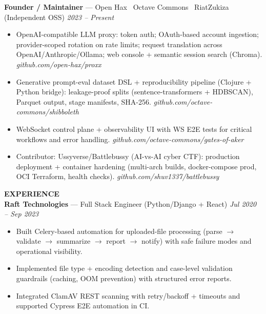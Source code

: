 \documentclass[10pt]{article}
\begin{document}
\textbf{Founder / Maintainer} --- Open Hax \textbullet\ Octave Commons \textbullet\ RiatZukiza (Independent OSS) \hfill \textit{2023 -- Present}\\
\vspace{-6pt}
\begin{itemize}
  \setlength\itemsep{-2pt}
  \setlength\parskip{0pt}
  \setlength\parsep{0pt}
  \item OpenAI-compatible LLM proxy: token auth; OAuth-based account ingestion; provider-scoped rotation on rate limits; request translation across OpenAI/Anthropic/Ollama; web console + semantic session search (Chroma). \textit{github.com/open-hax/proxx}
  \item Generative prompt-eval dataset DSL + reproducibility pipeline (Clojure + Python bridge): leakage-proof splits (sentence-transformers + HDBSCAN), Parquet output, stage manifests, SHA-256. \textit{github.com/octave-commons/shibboleth}
  \item WebSocket control plane + observability UI with WS E2E tests for critical workflows and error handling. \textit{github.com/octave-commons/gates-of-aker}
  \item Contributor: Ussyverse/Battlebussy (AI-vs-AI cyber CTF): production deployment + container hardening (multi-arch builds, docker-compose prod, OCI Terraform, health checks). \textit{github.com/shuv1337/battlebussy}
\end{itemize}

\vspace{6pt}
\textbf{EXPERIENCE}\\

\textbf{Raft Technologies} --- Full Stack Engineer (Python/Django + React) \hfill \textit{Jul 2020 -- Sep 2023}\\
\vspace{-6pt}
\begin{itemize}
  \setlength\itemsep{-2pt}
  \setlength\parskip{0pt}
  \setlength\parsep{0pt}
  \item Built Celery-based automation for uploaded-file processing (parse $\rightarrow$ validate $\rightarrow$ summarize $\rightarrow$ report $\rightarrow$ notify) with safe failure modes and operational visibility.
  \item Implemented file type + encoding detection and case-level validation guardrails (caching, OOM prevention) with structured error reports.
  \item Integrated ClamAV REST scanning with retry/backoff + timeouts and supported Cypress E2E automation in CI.
\end{itemize}
\end{document}
